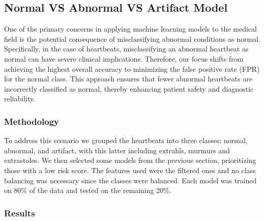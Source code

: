 \subsection{Normal VS Abnormal VS Artifact Model}
One of the primary concerns in applying machine learning models to the medical field is the potential 
consequence of misclassifying abnormal conditions as normal. Specifically, in the case of heartbeats, 
misclassifying an abnormal heartbeat as normal can have severe clinical implications. Therefore, 
our focus shifts from achieving the highest overall accuracy to minimizing the false positive rate (FPR) 
for the normal class. This approach ensures that fewer abnormal heartbeats are incorrectly classified as 
normal, thereby enhancing patient safety and diagnostic reliability.

\subsubsection{Methodology}
To address this scenario we grouped the heartbeats into three classes: normal, abnormal, and artifact, with this
latter including extrahls, murmurs and extrastoles. We then selected some models from the previous section,
prioritizing those with a low risk score. The features used were the filtered ones and no class balancing was
necessary since the classes were balanced.
Each model was trained on 80\% of the data and tested on the remaining 20\%.


\subsubsection{Results}